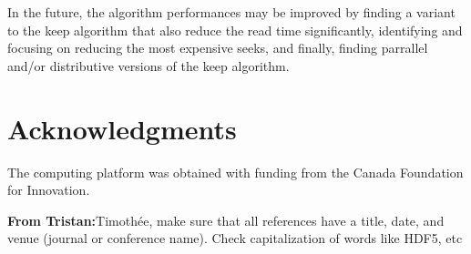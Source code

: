 \documentclass[sigconf, nonacm]{acmart}
\newcommand{\tristan}[1]{\color{orange}\textbf{From Tristan:}#1\color{black}}
\begin{document}
In the future, the algorithm performances may be improved by finding a variant
to the keep algorithm that also reduce the read time significantly,
identifying and focusing on reducing the most expensive seeks,
and finally, finding parrallel and/or distributive versions of the keep algorithm.

\section{Acknowledgments}

The computing platform was obtained with funding from the Canada Foundation for Innovation.

\tristan{Timothée, make sure that all references have a title, date, and venue (journal or conference name).
Check capitalization of words like HDF5, etc}



\end{document}
